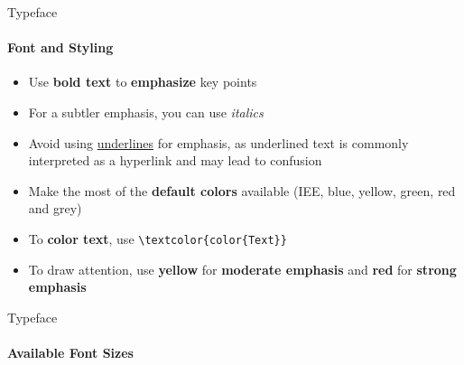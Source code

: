 \documentclass[aspectratio=169]{beamer}
\begin{document}
\begin{frame}{Typeface}
    \framesubtitle{Font and Styling}

    \vspace{-.8cm}
    \begin{coloredblock}
        \begin{itemize}
            \item Use \textbf{bold text} to \textbf{emphasize} key points
            \item For a subtler emphasis, you can use \textit{italics}
            \item Avoid using \underline{underlines} for emphasis, as underlined text is commonly interpreted as a hyperlink and may lead to confusion
        \end{itemize}
    \end{coloredblock}

    \vspace{0.2cm}

    \begin{coloredblock}
            \begin{itemize}
                \item Make the most of the \textbf{default colors} available (IEE, blue, yellow, green, red and grey)
                \item To \textbf{color text}, use \texttt{\textbackslash textcolor\{color\{Text\}\}}
                \item To draw attention, use \textbf{yellow} for \textbf{moderate emphasis} and \textbf{red} for \textbf{strong emphasis}
            \end{itemize}
    \end{coloredblock}
    
\end{frame}

\begin{frame}{Typeface}
    \framesubtitle{Available Font Sizes}
    \vfill
    \begin{columns}
        \centering
        \thefontsize[TINY]\TINY
        \thefontsize[Tiny]\Tiny
        \thefontsize[myFootnotesize]\myFootnotesize
        \thefontsize[tiny]\tiny
        \thefontsize[scriptsize]\scriptsize
        \thefontsize[footnotesize]\footnotesize
        \thefontsize[small]\small
        \thefontsize[normalsize]\normalsize
        \thefontsize[large]\large
    
        \centering
        \thefontsize[Large]\Large
        \thefontsize[LARGE]\LARGE
        \thefontsize[huge]\huge
        \thefontsize[Huge]\Huge
    \end{columns}
    \vfill
\end{frame}
\end{document}
